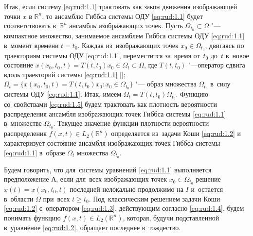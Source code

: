 Итак, если систему \eqref{eq:rud:1.1} трактовать как закон движения изображающей точки $x$ в $\mathbb R^n$, то ансамблю
Гиббса системы ОДУ \eqref{eq:rud:1.1} будет соответствовать в~$\mathbb R^n$ ансамбль изображающих точек. 
Пусть $\Omega_{t_0}\subset\Omega$ "--- компактное множество, занимаемое  ансамблем Гиббса системы ОДУ \eqref{eq:rud:1.1} в~момент времени $t=t_0$. 
Каждая из~изображающих точек $x_0\in\Omega_{t_0}$, двигаясь по траекториям системы ОДУ \eqref{eq:rud:1.1}, переместится за~время от~$t_0$ до~$t$ в~новое состояние $x(x_0,t_0,t)=T(t,t_0)x_0\in\Omega_t\subset\Omega$, где $T(t,t_0)$ "---оператор сдвига вдоль траекторий системы \eqref{eq:rud:1.1} []; $\Omega_t=\lbrace {x(x_0,t_0,t)=T(t,t_0)x_0:x_0\in\Omega_{t_0}}\rbrace$ "--- образ множества $\Omega_{t_0}$ в~силу системы ОДУ \eqref{eq:rud:1.1}.
Итак, имеем $\Omega_t=T(t,t_0)\Omega_{t_0}$. 
Функцию со~свойствами \eqref{eq:rud:1.5} будем трактовать как плотность
вероятности распределения ансамбля изображающих точек Гиббса
системы \eqref{eq:rud:1.1} в~множестве $\Omega_{t_0}$. Текущее
значение функции плотности вероятности распределения $f(x,t)\in
L_2{(\mathbb R^n)}$ определяется из~задачи Коши \eqref{eq:rud:1.2}
и характеризует состояние ансамбля изображающих точек Гиббса
системы \eqref{eq:rud:1.1} в~образе $\Omega_t$ множества
$\Omega_{t_0}$.

\smallskip

Будем говорить, что для~системы уравнений \eqref{eq:rud:1.1}
выполняется {\small \sc предположение А}, если для~всех изображающих точек
$x_0\in\Omega_{t_0}$ решение $x(t)=x(x_0,t_0,t)$ последней
нелокально продолжимо на $I$ и~остается в~области $\Omega$ при~всех $t\ge t_0$. Под~классическим решением задачи Коши
\eqref{eq:rud:1.2} с~оператором \eqref{eq:rud:1.3}, действующим
согласно \eqref{eq:rud:1.4}, будем понимать функцию $f(x,t)\in
L_2{(\mathbb R^n)}$, которая, будучи подставленной в~уравнение
\eqref{eq:rud:1.2}, обращает последнее в~тождество.

\smallskip

